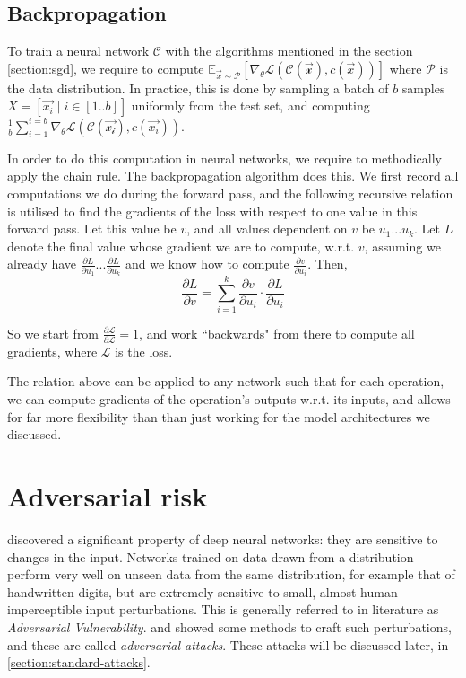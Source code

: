 \documentclass{ociamthesis}
\begin{document}
\subsection{Backpropagation}
To train a neural network $\mathcal{C}$ with the algorithms mentioned in the
section \ref{section:sgd}, we require to compute $\mathbb{E}_{\vec{x} \sim
\mathcal{P}}[\nabla_\theta \mathcal{L}(\mathcal{C(\vec{x})}, c(\vec{x}))]$ where
$\mathcal{P}$ is the data distribution. In practice, this is done by sampling a
batch of $b$ samples $X=[\vec{x_i}\mid i \in [1..b]]$ uniformly from the test
set, and computing $\frac{1}{b} \sum_{i=1}^{i=b} \nabla_\theta
\mathcal{L}(\mathcal{C(\vec{x_i})}, c(\vec{x_i}))$.

In order to do this computation in neural networks, we require to methodically
apply the chain rule. The backpropagation algorithm does this. We first record
all computations we do during the forward pass, and the following recursive
relation is utilised to find the gradients of the loss with respect to one value
in this forward pass. Let this value be $v$, and all values dependent on $v$ be
$u_1... u_k$. Let $L$ denote the final value whose gradient we are to compute,
w.r.t. $v$, assuming we already have $\frac{\partial L}{\partial u_1}...
\frac{\partial L}{\partial u_k}$ and we know how to compute $\frac{\partial
v}{\partial u_i}$. Then,
\begin{equation*}
    \frac{\partial L}{\partial v} = \sum_{i=1}^k {\frac{\partial
v}{\partial u_i}\cdot \frac{\partial L}{\partial u_i}}
\end{equation*}

So we start from $\frac{\partial \mathcal{L}}{\partial \mathcal{L}}=1$, and work
``backwards" from there to compute all gradients, where $\mathcal{L}$ is the
loss.

The relation above can be applied to any network such that for each operation,
we can compute gradients of the operation's outputs w.r.t. its inputs, and
allows for far more flexibility than than just working for the model
architectures we discussed.

\section{Adversarial risk}

\citet{42503} discovered a significant property of deep neural networks: they
are sensitive to changes in the input. Networks trained on data drawn from a
distribution perform very well on unseen data from the same distribution, for
example that of handwritten digits, but are extremely sensitive to small, almost
human imperceptible input perturbations. This is generally referred to in
literature as \emph{Adversarial Vulnerability}.
\citet{Goodfellow2015ExplainingAH} and \citet{madry2019deep} showed some methods
to craft such perturbations, and these are called \emph{adversarial attacks}.
These attacks will be discussed later, in \cref{section:standard-attacks}.
\end{document}
